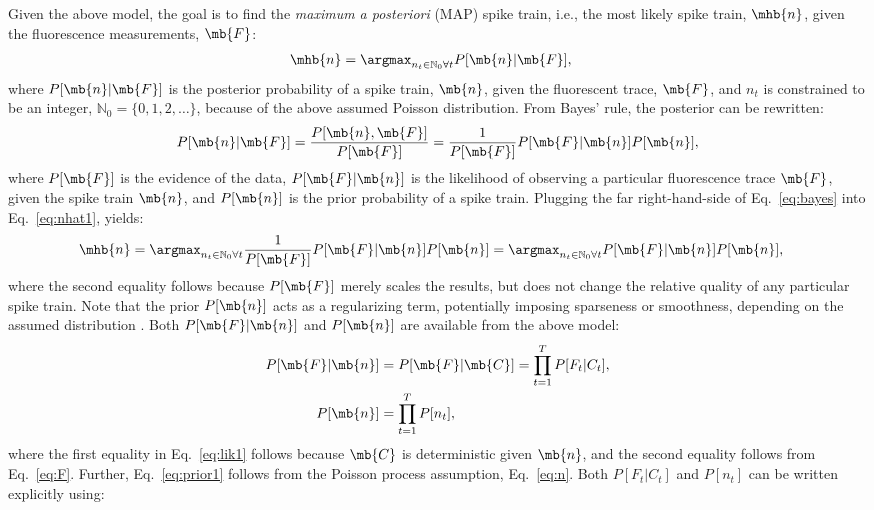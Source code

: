 Given the above model, the goal is to find the \emph{maximum a posteriori} (MAP) spike train, i.e.,  the most likely spike train, $\mhb{n}$,  given the fluorescence measurements, $\mb{F}$:
\begin{align} \label{eq:nhat1} 
\mhb{n} &=  \anx P[\mb{n} | \mb{F}], 
\end{align}
\noindent where $P[\mb{n} | \mb{F}]$ is the posterior probability of a spike train, $\mb{n}$, given the fluorescent trace, $\mb{F}$, and $n_t$ is constrained to be an integer, $\mathbb{N}_0=\{0,1,2,\ldots\}$, because of the above assumed Poisson distribution.  From Bayes' rule, the posterior can be rewritten:
\begin{align} \label{eq:bayes}
P[\mb{n} | \mb{F}] = \frac{P[\mb{n}, \mb{F}]}{P[\mb{F}]} = \frac{1}{P[\mb{F}]} P[\mb{F} | \mb{n}] P[\mb{n}],
\end{align}
\noindent where $P[\mb{F}]$ is the evidence of the data, $P[\mb{F} | \mb{n}]$ is the likelihood of observing a particular fluorescence trace $\mb{F}$, given the spike train $\mb{n}$, and $P[\mb{n}]$ is the prior probability of a spike train.  Plugging the far right-hand-side of Eq.~\eqref{eq:bayes} into Eq.~\eqref{eq:nhat1}, yields:
\begin{align} \label{eq:nhat2} 
\mhb{n} &=  \anx \frac{1}{P[\mb{F}]} P[\mb{F} | \mb{n}] P[\mb{n}] =  \anx  P[\mb{F} | \mb{n}] P[\mb{n}],
\end{align}
\noindent where the second equality follows because $P[\mb{F}]$ merely scales the results, but does not change the relative quality of any particular spike train.  Note that the prior $P[\mb{n}]$ acts as a regularizing term, potentially imposing sparseness or smoothness, depending on the assumed distribution \cite{WuGallant06,Seeger08}. Both $P[\mb{F} | \mb{n}]$ and $P[\mb{n}]$ are available from the above model:
\begin{subequations} \label{eq:post1}
\begin{align}
P[\mb{F} | \mb{n}]&= P[\mb{F} | \mb{C}] 	= \prod_{t=1}^T P[F_t | C_t], \label{eq:lik1} \\ 
P[\mb{n}] 		&= \prod_{t=1}^T P[n_t], \label{eq:prior1}
\end{align}
\end{subequations}
\noindent where the first equality in Eq.~\eqref{eq:lik1} follows because $\mb{C}$ is deterministic given $\mb{n}$, and the second equality follows from Eq.~\eqref{eq:F}. Further, Eq.~\eqref{eq:prior1} follows from the Poisson process assumption, Eq.~\eqref{eq:n}.  Both $P[F_t | C_t]$ and $P[n_t]$ can be written explicitly using:
